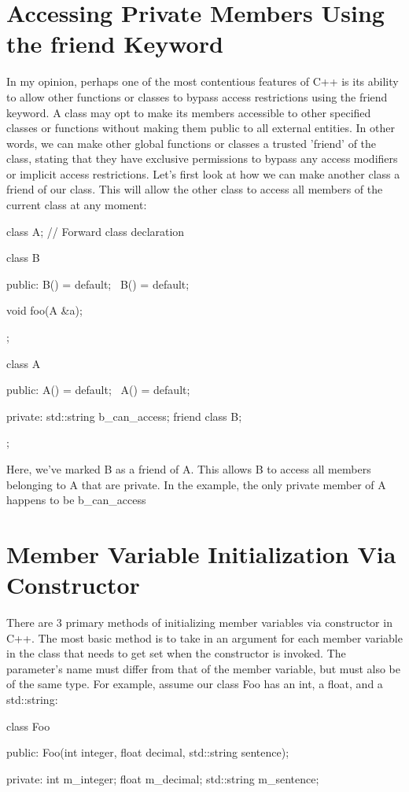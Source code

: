 \documentclass{article}
\begin{document}
\section{Accessing Private Members Using the friend Keyword}

In my opinion, perhaps one of the most contentious features of C++ is its ability to allow other functions
or classes to bypass access restrictions using the friend keyword. A class may opt to make its members
accessible to other specified classes or functions without making them public to all external entities. In
other words, we can make other global functions or classes a trusted 'friend' of the class, stating that they
have exclusive permissions to bypass any access modifiers or implicit access restrictions. Let's first look
at how we can make another class a friend of our class. This will allow the other class to access all members
of the current class at any moment:

\begin{cpplst}

class A; // Forward class declaration

class B
{
public:
    B() = default;
    ~B() = default;

    void foo(A &a);
};

class A
{
public:
    A() = default;
    ~A() = default;

private:
    std::string b_can_access;
    friend class B;
};

\end{cpplst}

Here, we've marked B as a friend of A. This allows B to access all members belonging to A that are private.
In the example, the only private member of A happens to be b\_can\_access

\section{Member Variable Initialization Via Constructor}

There are 3 primary methods of initializing member variables via constructor in C++. The most basic method is
to take in an argument for each member variable in the class that needs to get set when the constructor is
invoked. The parameter's name must differ from that of the member variable, but must also be of the same type.
For example, assume our class Foo has an int, a float, and a std::string:

\begin{cpplst}

class Foo
{
public:
    Foo(int integer, float decimal, std::string sentence);

private:
    int m_integer;
    float m_decimal;
    std::string m_sentence;
}

\end{cpplst}
\end{document}
